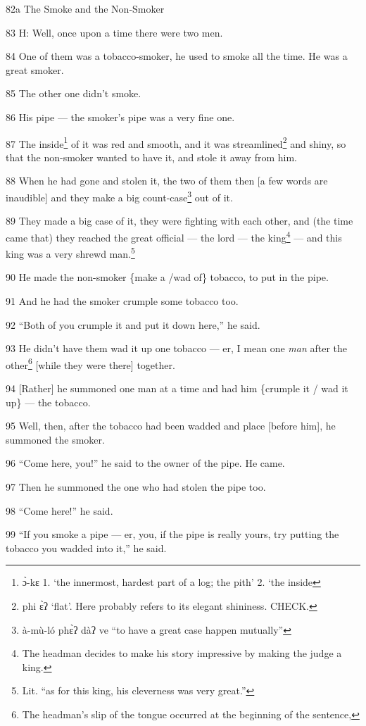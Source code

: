 
82a The Smoke and the Non-Smoker

83 H: Well, once upon a time there were two men.

84 One of them was a tobacco-smoker, he used to smoke all the time. He was a great
smoker.

85 The other one didn't smoke.

86 His pipe --- the smoker's pipe was a very fine one.

87 The inside\footnote{ɔ̀-kɛ 1. `the innermost, hardest part of a log; the pith' 2. `the inside} of it was red and smooth, and it was streamlined\footnote{phi ɛ̀ʔ `flat'. Here probably refers to its elegant shininess. CHECK.} and shiny,
so that the non-smoker wanted to have it, and stole it away from him.

88 When he had gone and stolen it, the two of them then [a few words are inaudible]
and they make a big count-case\footnote{à-mù-ló phɛ̀ʔ dàʔ ve ``to have a great case happen mutually''} out of it.

89 They made a big case of it, they were fighting with each other, and (the time
came that) they reached the great official --- the lord --- the king\footnote{The headman decides to make his story impressive by making the judge a king.} --- and
this king was a very shrewd man.\footnote{Lit. ``as for this king, his cleverness was very great.''}

90 He made the non-smoker \{make a /wad of\} tobacco, to put in the pipe.

91 And he had the smoker crumple some tobacco too.

92 ``Both of you crumple it and put it down here,'' he said.

93 He didn't have them wad it up one tobacco --- er, I mean one \textit{man} after
the other\footnote{The headman's slip of the tongue occurred at the beginning of the sentence,} [while they were there] together.

94 [Rather] he summoned one man at a time and had him \{crumple it / wad it up\}
--- the tobacco.

95 Well, then, after the tobacco had been wadded and place [before him], he summoned
the smoker.

96 ``Come here, you!'' he said to the owner of the pipe. He came.

97 Then he summoned the one who had stolen the pipe too.

98 ``Come here!'' he said.

99 ``If you smoke a pipe --- er, you, if the pipe is really yours, try putting
the tobacco you wadded into it,'' he said.

